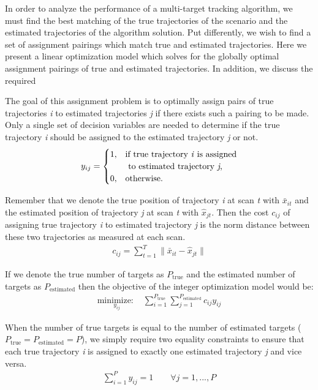 In order to analyze the performance of a multi-target tracking algorithm, we must find the best matching of the true trajectories of the scenario and the estimated trajectories of the algorithm solution. Put differently, we wish to find a set of assignment pairings which match true and estimated trajectories. Here we present a linear optimization model which solves for the globally optimal assignment pairings of true and estimated trajectories. In addition, we discuss the required 

The goal of this assignment problem is to optimally assign pairs of true trajectories \textit{i} to estimated trajectories \textit{j} if there exists such a pairing to be made. Only a single set of decision variables are needed to determine if the true trajectory \textit{i} should be assigned to the estimated trajectory \textit{j} or not. 
\[y_{ij} = 
\begin{cases}
1, & \text{if true trajectory \textit{i} is assigned}\\
    & \text{ to estimated trajectory \textit{j},}\\
0, & \text{otherwise.}
\end{cases}\]

Remember that we denote the true position of trajectory \textit{i} at scan \textit{t} with $\bar{x}_{it}$ and the estimated position of trajectory \textit{j} at scan \textit{t} with $\hat{x}_{jt}$. Then the cost $c_{ij}$ of assigning true trajectory \textit{i} to estimated trajectory \textit{j} is the norm distance between these two trajectories as measured at each scan. 
\begin{align}
	c_{ij} = \sum_{t=1}^{T} \|\bar{x}_{it} - \hat{x}_{jt}\|
\end{align}

If we denote the true number of targets as $P_{\text{true}}$ and the estimated number of targets as $P_{\text{estimated}}$ then the objective of the integer optimization model would be:
\begin{align}
\underset{y_{ij}}{\text{minimize: }} & \sum_{i=1}^{P_{\text{true}}} \sum_{j=1}^{P_{\text{estimated}}} c_{ij}y_{ij}
\end{align}

When the number of true targets is equal to the number of estimated targets ($P_{\text{true}} = P_{\text{estimated}} = P$), we simply require two equality constraints to ensure that each true trajectory \textit{i} is assigned to exactly one estimated trajectory \textit{j} and vice versa. 
\begin{align}\label{eqn:assignment_1}
\sum_{i=1}^{P} y_{ij} = 1 \qquad \forall j = 1,...,P
\end{align}

